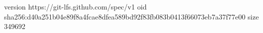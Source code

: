 version https://git-lfs.github.com/spec/v1
oid sha256:d40a251b04e89f8a4fcae8dfea589bd92f83fb083b0413f66073eb7a37f77e00
size 349692
